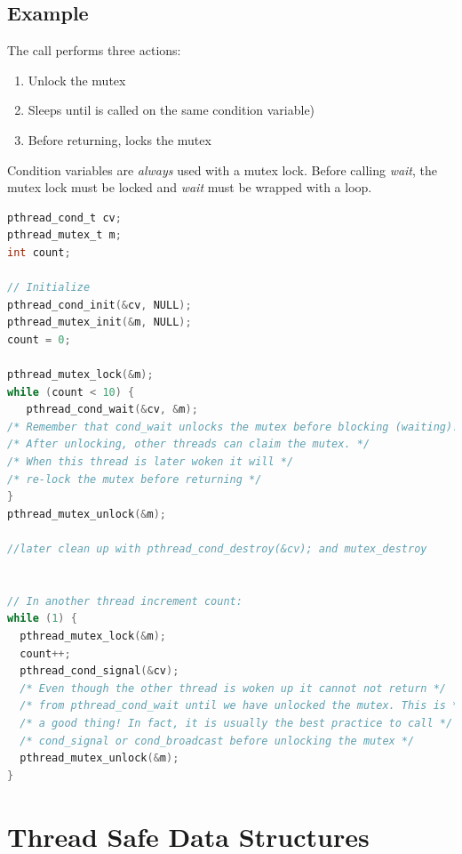 \subsection{Example}\label{example}

The call  performs three actions: 

\begin{enumerate}
\item Unlock the mutex\
\item Sleeps until  is called on the same condition variable) 
\item Before returning, locks the mutex
\end{enumerate}

Condition variables are \emph{always} used with a mutex lock. Before calling \emph{wait}, the mutex lock must be locked and \emph{wait} must be wrapped with a loop.

\begin{lstlisting}[language=C]
pthread_cond_t cv;
pthread_mutex_t m;
int count;

// Initialize
pthread_cond_init(&cv, NULL);
pthread_mutex_init(&m, NULL);
count = 0;

pthread_mutex_lock(&m);
while (count < 10) {
   pthread_cond_wait(&cv, &m); 
/* Remember that cond_wait unlocks the mutex before blocking (waiting)! */
/* After unlocking, other threads can claim the mutex. */
/* When this thread is later woken it will */
/* re-lock the mutex before returning */
}
pthread_mutex_unlock(&m);

//later clean up with pthread_cond_destroy(&cv); and mutex_destroy 


// In another thread increment count:
while (1) {
  pthread_mutex_lock(&m);
  count++;
  pthread_cond_signal(&cv);
  /* Even though the other thread is woken up it cannot not return */
  /* from pthread_cond_wait until we have unlocked the mutex. This is */
  /* a good thing! In fact, it is usually the best practice to call */
  /* cond_signal or cond_broadcast before unlocking the mutex */
  pthread_mutex_unlock(&m);
}
\end{lstlisting}



\section{Thread Safe Data Structures}

